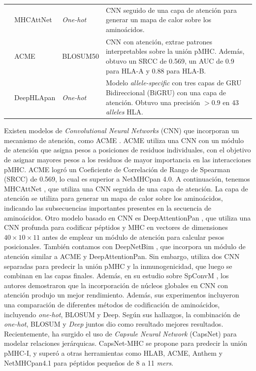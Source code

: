 \begin{table}[ht]
{\begin{scriptsize}
\begin{tabular}{p{2.5cm}p{2.5cm}p{2cm}p{6.2cm}}
			\cite{venkatesh2020mhcattnnet}         & MHCAttNet        & \textit{One-hot}            & CNN seguido de una capa de atención para generar un mapa de calor sobre los aminoácidos.     \\
			
			\cite{hu2019acme}          & ACME                     & BLOSUM50     & CNN con atención, extrae patrones interpretables sobre la unión pMHC. Además, obtuvo un SRCC de 0.569, un AUC de 0.9 para HLA-A y 0.88 para HLA-B.  \\    
			
			
			\cite{wu2019deephlapan}                      & DeepHLApan                              & \textit{One-hot}             & Modelo \textit{allele-specific} con tres capas de GRU Bidireccional (BiGRU) con una capa de atención. Obtuvo una precisión $> 0.9$ en 43 \textit{alleles} HLA.                                               
		\end{tabular}
	\end{scriptsize}
	}
\end{table}

Existen modelos de \textit{Convolutional Neural Networks} (CNN) que incorporan un mecanismo de atención, como ACME \citep{hu2019acme}. ACME utiliza una CNN con un módulo de atención que asigna pesos a posiciones de residuos individuales, con el objetivo de asignar mayores pesos a los residuos de mayor importancia en las interacciones pMHC. ACME logró un Coeficiente de Correlación de Rango de Spearman (SRCC) de 0.569, lo cual es superior a NetMHCpan 4.0. A continuación, tenemos MHCAttNet \citep{venkatesh2020mhcattnnet}, que utiliza una CNN seguida de una capa de atención. La capa de atención se utiliza para generar un mapa de calor sobre los aminoácidos, indicando las subsecuencias importantes presentes en la secuencia de aminoácidos. Otro modelo basado en CNN es DeepAttentionPan \citep{jin2021deep}, que utiliza una CNN profunda para codificar péptidos y MHC en vectores de dimensiones $40\times 10 \times 11$ antes de emplear un módulo de atención para calcular pesos posicionales. También contamos con DeepNetBim \citep{yang2021deepnetbim}, que incorpora un módulo de atención similar a ACME y DeepAttentionPan. Sin embargo, utiliza dos CNN separadas para predecir la unión pMHC y la inmunogenicidad, que luego se combinan en las capas finales. Además, en su estudio sobre SpConvM \citep{chen2021ranking}, los autores demostraron que la incorporación de núcleos globales en CNN con atención produjo un mejor rendimiento. Además, sus experimentos incluyeron una comparación de diferentes métodos de codificación de aminoácidos, incluyendo \textit{one-hot}, BLOSUM y Deep. Según sus hallazgos, la combinación de \textit{one-hot}, BLOSUM y \textit{Deep} juntos dio como resultado mejores resultados. Recientemente, ha surgido el uso de \textit{Capsule Neural Network} (CapsNet) para modelar relaciones jerárquicas. CapsNet-MHC \citep{kalemati2023capsnet} se propone para predecir la unión pMHC-I, y superó a otras herramientas como HLAB, ACME, Anthem y NetMHCpan4.1 para péptidos pequeños de 8 a 11 \textit{mers}.

